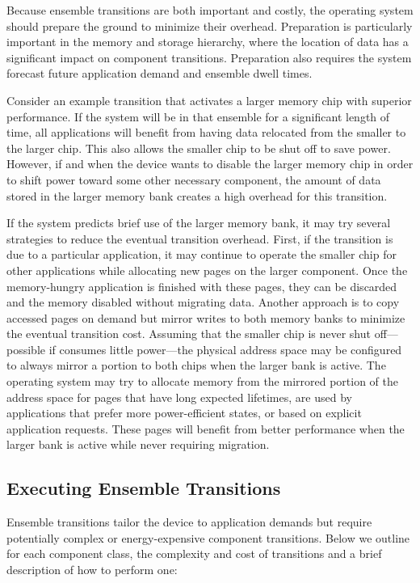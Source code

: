 Because ensemble transitions are both important and costly, the operating
system should prepare the ground to minimize their overhead. Preparation is
particularly important in the memory and storage hierarchy, where the
location of data has a significant impact on component transitions.
Preparation also requires the system forecast future application demand and
ensemble dwell times.

Consider an example transition that activates a larger memory chip with
superior performance. If the system will be in that ensemble for a
significant length of time, all applications will benefit from having data
relocated from the smaller to the larger chip. This also allows the smaller
chip to be shut off to save power. However, if and when the device wants to
disable the larger memory chip in order to shift power toward some other
necessary component, the amount of data stored in the larger memory bank
creates a high overhead for this transition.

If the system predicts brief use of the larger memory bank, it may try
several strategies to reduce the eventual transition overhead. First, if the
transition is due to a particular application, it may continue to operate the
smaller chip for other applications while allocating new pages on the larger
component. Once the memory-hungry application is finished with these pages,
they can be discarded and the memory disabled without migrating data. Another
approach is to copy accessed pages on demand but mirror writes to both memory
banks to minimize the eventual transition cost. Assuming that the smaller
chip is never shut off---possible if consumes little power---the physical
address space may be configured to always mirror a portion to both chips when
the larger bank is active. The operating system may try to allocate memory
from the mirrored portion of the address space for pages that have long
expected lifetimes, are used by applications that prefer more power-efficient
states, or based on explicit application requests. These pages will benefit
from better performance when the larger bank is active while never requiring
migration.

\subsection{Executing Ensemble Transitions}
\label{subsec-execute}

Ensemble transitions tailor the device to application demands but require
potentially complex or energy-expensive component transitions. Below we
outline for each component class, the complexity and cost of transitions and
a brief description of how to perform one:

